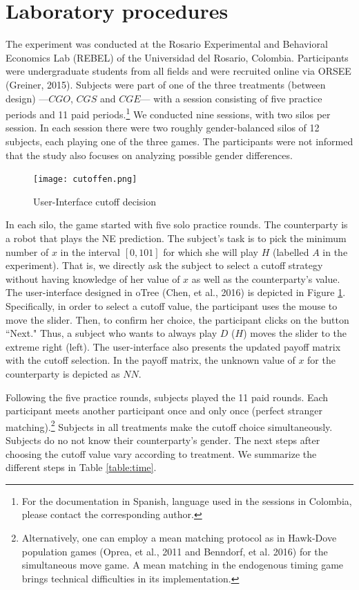 \documentclass[12pt,english]{article}
\begin{document}
\section{Laboratory procedures}
\label{sec:game}

The experiment was conducted at the Rosario Experimental and Behavioral Economics Lab (REBEL) of the Universidad del Rosario, Colombia. Participants were undergraduate students from all fields and were recruited online via ORSEE (Greiner, 2015). Subjects were part of one of the three treatments (between design) ---$CGO$, $CGS$ and $CGE$---  with  a session consisting of five practice periods and 11 paid periods.\footnote{For the documentation in Spanish, language used in the sessions in Colombia, please contact the corresponding author.} We conducted nine sessions, with two silos per session. In each session there were two roughly gender-balanced silos of 12 subjects, each playing one of the three games. The participants were not informed that the study also focuses on analyzing possible gender differences.

\begin{center}
\begin{figure}[ht]
\centering{}%
\texttt{[image: cutoffen.png]}%
\caption{User-Interface cutoff decision} 
\label{fig:ui}
\end{figure}
\end{center}
In each silo, the game started with five solo practice rounds. The counterparty is a robot that plays the NE prediction. The subject's task is to pick the minimum number of $x$ in the interval $[0,101]$ for which she will play $H$ (labelled $A$ in the experiment). That is, we directly ask the subject to select a cutoff strategy without having knowledge of her value of $x$ as well as the counterparty's value. The user-interface designed in oTree (Chen, et al., 2016) is depicted in Figure \ref{fig:ui}. Specifically, in order to select a cutoff value, the participant uses the mouse to move the slider. Then, to confirm her choice, the participant clicks on the button ``Next." Thus, a subject who wants to always play $D$ ($H$)  moves the slider to the extreme right (left). The user-interface also presents the updated payoff matrix with the cutoff selection. In the payoff matrix, the unknown value of $x$ for the counterparty is depicted as $NN$.

Following the five practice rounds, subjects played the 11 paid rounds. Each participant meets another participant once and only once (perfect stranger matching).\footnote{Alternatively, one can employ a mean matching protocol as in Hawk-Dove population games (Oprea, et al., 2011 and Benndorf, et al. 2016) for the simultaneous move game. A mean matching in the endogenous timing game brings technical difficulties in its implementation.} Subjects in all treatments make the cutoff choice simultaneously. Subjects do no not know their counterparty's gender. The next steps after choosing the cutoff value vary according to treatment. We summarize the different steps in Table \ref{table:time}. 
\end{document}
